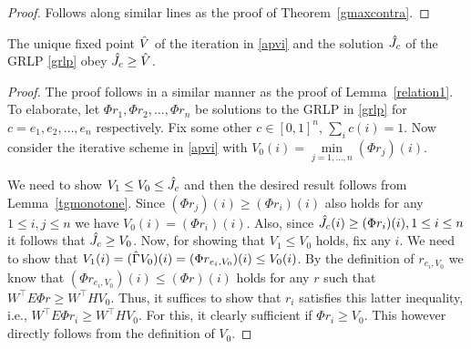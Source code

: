 \begin{proof}
Follows along similar lines as the proof of Theorem~\ref{gmaxcontra}.
\end{proof}
\begin{lemma}\label{relation2}
The unique fixed point $\hat{V}$ of the iteration in \eqref{apvi} and the solution $\hat{J}_c$ of the GRLP \eqref{grlp} obey $\hat{J}_c\geq\hat{V}$.
\end{lemma}
\begin{proof}
The proof follows in a similar manner as the proof of Lemma~\ref{relation1}. To elaborate, let $\Phi r_1, \Phi r_2,\ldots,\Phi r_n$ be solutions to the GRLP in \eqref{grlp} for $c=e_1, e_2,\ldots,e_n$ respectively. Fix some other $c\in [0,1]^n$, $\sum_i c(i)=1$. Now consider the iterative scheme in \eqref{apvi} with $V_0(i)=\underset{j=1,\ldots,n}{\min}(\Phi r_j)(i)$.\par
We need to show $V_1\le V_0 \le \hat{J}_c$ and then the desired result follows from Lemma~\ref{tgmonotone}. Since $(\Phi r_j)(i) \ge (\Phi r_i)(i)$ also holds for any $1\leq i,j\leq n$ we have $V_0(i)  = (\Phi r_i)(i)$. Also, since $\hat{J}_c(i) \ge (\Phi r_i)(i),1\leq i \leq n$ it follows that $\hat{J}_c\geq V_0$. Now, for showing that $V_1 \le V_0$ holds, fix any $i$. We need to show that $V_1(i)=(\hat{\Gamma} V_0)(i) = (\Phi r_{e_i,V_0})(i) \leq V_0(i)$. By the definition of $r_{e_i,V_0}$ we know that $(\Phi r_{e_i,V_0})(i) \le (\Phi r)(i)$
holds for any $r$ such that $W^\top E \Phi r \ge W^\top H V_0$. Thus, it suffices to show that $r_i$ satisfies this latter inequality, i.e., $W^\top E \Phi r_i \ge W^\top H V_0$. For this, it clearly sufficient if $\Phi r_i \ge V_0$. This however directly follows from the definition of $V_0$.
\begin{comment}
It is clear from the definition of $V_0$ that $\hj(i),(\Phi r_j)(i)\geq(\Phi r_i)(i)$, $i=1,\ldots,n$.
In particular, it follows that $V_0(i) =( \Phi r_i)(i)$ and so
$\Phi r_i \geq V_0$.
From the monotone property of $T$ (viz. $H$) we have 
$H\Phi r_i\geq H V_0$ and also, by minimizing component-wise
$E\Phi r_i\geq H\Phi r_i\geq HV_0$. Thus,
$E V_0\geq H V_0$. 
\todoc[inline]{I lost why this was needed.
I think the proof would be much easier to understand if we introduced $r_{c,J} = \argmin_{r} \{ c^\top \Phi r \,|\, W^\top E \Phi r \ge W^\top H J\}$. We could start by saying we need $V_1\le V_0 \le \hj$ because then Lemma~\ref{tgmonotone} will give the desired result. Next, $V_0\le \hj$ holds because on the one hand, $\hj(i) \ge (\Phi r_i)(i)$ for any $i$, while on the other hand,
$(\Phi r_j)(i) \ge (\Phi r_i)(i)$ also holds for any $i,j$, hence $V_0(i)  = (\Phi r_i)(i)$. 

\end{comment}
\end{proof}
